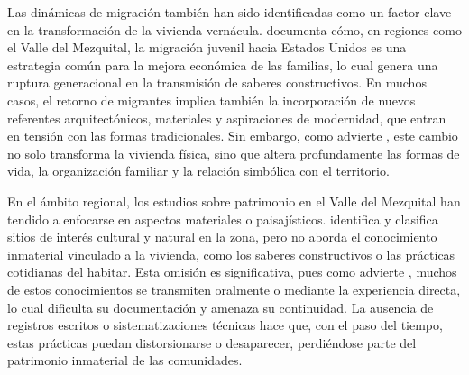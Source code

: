 Las dinámicas de migración también han sido identificadas como un factor clave en la transformación de la vivienda vernácula. \cite{baez2012pueblos} documenta cómo, en regiones como el Valle del Mezquital, la migración juvenil hacia Estados Unidos es una estrategia común para la mejora económica de las familias, lo cual genera una ruptura generacional en la transmisión de saberes constructivos. En muchos casos, el retorno de migrantes implica también la incorporación de nuevos referentes arquitectónicos, materiales y aspiraciones de modernidad, que entran en tensión con las formas tradicionales. Sin embargo, como advierte \citeauthor{gandara2000}, este cambio no solo transforma la vivienda física, sino que altera profundamente las formas de vida, la organización familiar y la relación simbólica con el territorio.

En el ámbito regional, los estudios sobre patrimonio en el Valle del Mezquital han tendido a enfocarse en aspectos materiales o paisajísticos. \cite{rodriguezestudio} identifica y clasifica sitios de interés cultural y natural en la zona, pero no aborda el conocimiento inmaterial vinculado a la vivienda, como los saberes constructivos o las prácticas cotidianas del habitar. Esta omisión es significativa, pues como advierte \cite{guerrero2007arquitectura}, muchos de estos conocimientos se transmiten oralmente o mediante la experiencia directa, lo cual dificulta su documentación y amenaza su continuidad. La ausencia de registros escritos o sistematizaciones técnicas hace que, con el paso del tiempo, estas prácticas puedan distorsionarse o desaparecer, perdiéndose parte del patrimonio inmaterial de las comunidades.
